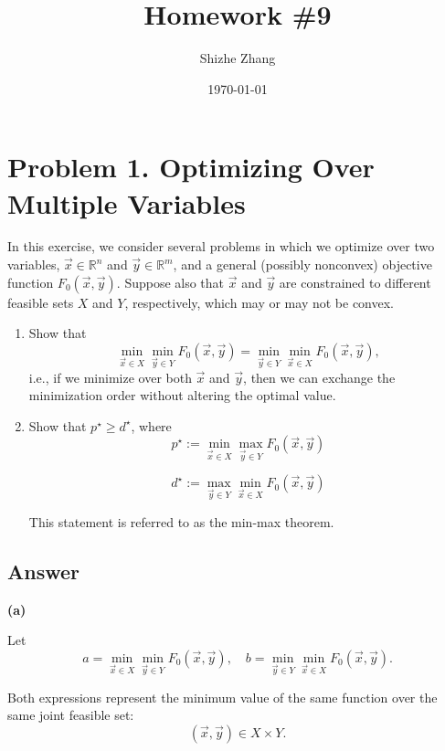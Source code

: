 \documentclass[
	12pt,
]{fphw}
\title{Homework \#9} %
\author{Shizhe Zhang} %
\date{\today} %
\institute{University of California, Berkeley \\ Department of Statistics} %
\begin{document}
\maketitle %


\section*{Problem 1. Optimizing Over Multiple Variables}


In this exercise, we consider several problems in which we optimize over two variables, $\vec{x} \in \mathbb{R}^n$ and $\vec{y} \in \mathbb{R}^m$, and a general (possibly nonconvex) objective function $F_0(\vec{x}, \vec{y})$. Suppose also that $\vec{x}$ and $\vec{y}$ are constrained to different feasible sets $X$ and $Y$, respectively, which may or may not be convex.

\begin{enumerate}
\item[(a)] Show that
\[
\min_{\vec{x}\in X}\min_{\vec{y}\in Y} F_0(\vec{x},\vec{y})
=
\min_{\vec{y}\in Y}\min_{\vec{x}\in X} F_0(\vec{x},\vec{y}),
\]
i.e., if we minimize over both $\vec{x}$ and $\vec{y}$, then we can exchange the minimization order without altering the optimal value.

\item[(b)] Show that $p^\star \ge d^\star$, where
\[
p^\star := \min_{\vec{x}\in X}\max_{\vec{y}\in Y} F_0(\vec{x},\vec{y})
\]

\[
d^\star := \max_{\vec{y}\in Y}\min_{\vec{x}\in X} F_0(\vec{x},\vec{y})
\]

This statement is referred to as the min-max theorem.
\end{enumerate}

\subsection*{Answer}

\textbf{(a)}

Let
\[
a = \min_{\vec{x}\in X}\min_{\vec{y}\in Y} F_0(\vec{x},\vec{y}),
\quad
b = \min_{\vec{y}\in Y}\min_{\vec{x}\in X} F_0(\vec{x},\vec{y}).
\]

Both expressions represent the minimum value of the same function over the same joint feasible set:
\[
(\vec{x},\vec{y}) \in X \times Y .
\]
\end{document}
